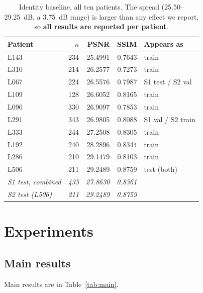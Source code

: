 \documentclass[conference]{IEEEtran}
\begin{document}
\begin{table}[t]
\centering
\caption{Identity baseline, all ten patients. The spread
(25.50--29.25~dB, a 3.75~dB range) is larger than any effect we report, so
\textbf{all results are reported per patient}.}
\label{tab:floor}
\small
\setlength{\tabcolsep}{4pt}
\begin{tabular}{@{}lrrrl@{}}
\toprule
Patient & $n$ & PSNR & SSIM & Appears as\\
\midrule
L143 & 234 & 25.4991 & 0.7643 & train\\
L310 & 214 & 26.2577 & 0.7273 & train\\
L067 & 224 & 26.5576 & 0.7987 & S1 test / S2 val\\
L109 & 128 & 26.6052 & 0.8165 & train\\
L096 & 330 & 26.9097 & 0.7853 & train\\
L291 & 343 & 26.9805 & 0.8088 & S1 val / S2 train\\
L333 & 244 & 27.2508 & 0.8305 & train\\
L192 & 240 & 28.2896 & 0.8344 & train\\
L286 & 210 & 29.1479 & 0.8103 & train\\
L506 & 211 & 29.2489 & 0.8759 & test (both)\\
\midrule
\emph{S1 test, combined} & \emph{435} & \emph{27.8630} & \emph{0.8361} &\\
\emph{S2 test (L506)} & \emph{211} & \emph{29.2489} & \emph{0.8759} &\\
\bottomrule
\end{tabular}
\end{table}

\section{Experiments}

\subsection{Main results}
\label{sec:main-res}
Main results are in Table~\ref{tab:main}.
\end{document}
